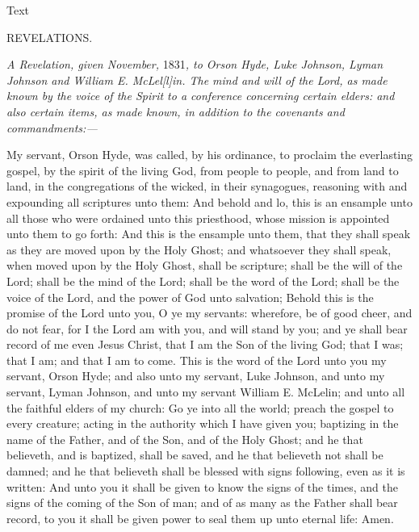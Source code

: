 			\begin{description}
				\item[Text]
			\end{description}
			
				\begin{tightcenter}
				REVELATIONS.
				\end{tightcenter}

				\textit{A Revelation, given November,} 1831\textit{, to Orson Hyde, Luke Johnson, Lyman Johnson and William E. McLel[l]in. The mind and will of the Lord, as made known by the voice of the Spirit to a conference concerning certain elders: and also certain items, as made known, in addition to the covenants and commandments:---}

				My servant, Orson Hyde, was called, by his ordinance, to proclaim the everlasting gospel, by the spirit of the living God, from people to people, and from land to land, in the congregations of the wicked, in their synagogues, reasoning with and expounding all scriptures unto them: And behold and lo, this is an ensample unto all those who were ordained unto this priesthood, whose mission is appointed unto them to go forth: And this is the ensample unto them, that they shall speak as they are moved upon by the Holy Ghost; and whatsoever they shall speak, when moved upon by the Holy Ghost, shall be scripture; shall be the will of the Lord; shall be the mind of the Lord; shall be the word of the Lord; shall be the voice of the Lord, and the power of God unto salvation; Behold this is the promise of the Lord unto you, O ye my servants: wherefore, be of good cheer, and do not fear, for I the Lord am with you, and will stand by you; and ye shall bear record of me even Jesus Christ, that I am the Son of the living God; that I was; that I am; and that I am to come. This is the word of the Lord unto you my servant, Orson Hyde; and also unto my servant, Luke Johnson, and unto my servant, Lyman Johnson, and unto my servant William E. McLelin; and unto all the faithful elders of my church: Go ye into all the world; preach the gospel to every creature; acting in the authority which I have given you; baptizing in the name of the Father, and of the Son, and of the Holy Ghost; and he that believeth, and is baptized, shall be saved, and he that believeth not shall be damned; and he that believeth shall be blessed with signs following, even as it is written: And unto you it shall be given to know the signs of the times, and the signs of the coming of the Son of man; and of as many as the Father shall bear record, to you it shall be given power to seal them up unto eternal life: Amen.

